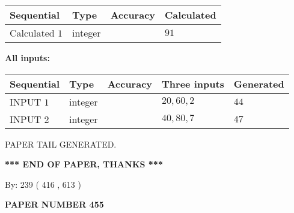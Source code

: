 \documentclass[12pt]{article}
\begin{document}
   
  
  
\noindent\begin{tabular}{|l|l|l|l|}
\hline
 Sequential & Type & Accuracy & Calculated \\ 
\hline
 
 
  Calculated $  1 $ & integer &  & 
  $ 91 $ 
 \\  \hline  
 \end{tabular}
   
   
   
   
\noindent\vspace{0.1in}\hspace{-0.08in} {\textbf{\Large{All inputs: }}}
   
   
  
  
\noindent\begin{tabular}{|l|l|l|l|l|}
\hline
 Sequential & Type & Accuracy & Three inputs & Generated \\ 
\hline
 
 
  INPUT $  1 $ & integer &  & $
 20
 , 
 60
 , 
 2
 $ & $ 44 $ 
 \\  \hline  
 
 
  INPUT $  2 $ & integer &  & $
 40
 , 
 80
 , 
 7
 $ & $ 47 $ 
 \\  \hline  
 \end{tabular}
   
   
   
   
   
   
 \vspace{0.2in}
 
   
   
\vspace{2.0in} PAPER TAIL GENERATED.
   
   
   
   
\vspace{1.0in} 
{\textbf{\large{ *** END OF PAPER, THANKS *** }}} 
   
   
\hspace{1.0in} By: 
 239 ( 416 ,  613 )
   
   
   
   
\newpage 
\setcounter{page}{ 
   455001 } 
   
   
   
   
 {\textbf{ \Large{ PAPER NUMBER  455  }}}
   
   
\vspace{0.2in}
   
   
   
\end{document}
